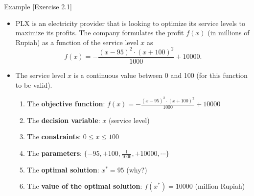 \documentclass [xcolor=svgnames, handout]{beamer}
\begin{document}
\begin{frame}{Example [Exercise 2.1]}
    \begin{itemize}[<.->]
        \item PLX is an electricity provider that is looking to optimize its service levels to maximize its profits. The company formulates the profit $f(x)$ (in millions of Rupiah) as a function of the service level $x$ as 
        \begin{equation}
            f(x) = -\frac{(x-95)^2 \cdot (x+100)^2}{1000} + 10000. \nonumber
        \end{equation}
    
        \item The service level $x$ is a continuous value between 0 and 100 (for this function to be valid).
        \begin{enumerate}[<+->]
            \item The \textbf{objective function}: $f(x) = -\frac{(x-95)^2 \cdot (x+100)^2}{1000} + 10000$
            \item The \textbf{decision variable}: $x$ (service level)
            \item The \textbf{constraints}: $0 \leq x \leq 100$
            \item The \textbf{parameters}: $\{-95, +100, \frac{1}{1000}, +10000, \cdots \}$
            \item The \textbf{optimal solution}: $x^* = 95$ (why?)
            \item The \textbf{value of the optimal solution}: $f(x^*) = 10000$ (million Rupiah)
        \end{enumerate}
    \end{itemize}
\end{frame}
\end{document}
